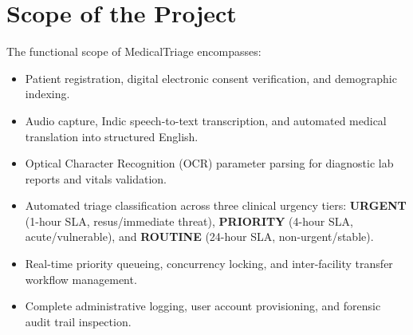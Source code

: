 \documentclass[11pt,a4paper,oneside]{report}
\begin{document}
\section{Scope of the Project}
The functional scope of MedicalTriage encompasses:
\begin{itemize}[leftmargin=20pt]
  \item Patient registration, digital electronic consent verification, and demographic indexing.
  \item Audio capture, Indic speech-to-text transcription, and automated medical translation into structured English.
  \item Optical Character Recognition (OCR) parameter parsing for diagnostic lab reports and vitals validation.
  \item Automated triage classification across three clinical urgency tiers: \textbf{URGENT} (1-hour SLA, resus/immediate threat), \textbf{PRIORITY} (4-hour SLA, acute/vulnerable), and \textbf{ROUTINE} (24-hour SLA, non-urgent/stable).
  \item Real-time priority queueing, concurrency locking, and inter-facility transfer workflow management.
  \item Complete administrative logging, user account provisioning, and forensic audit trail inspection.
\end{itemize}
\end{document}
